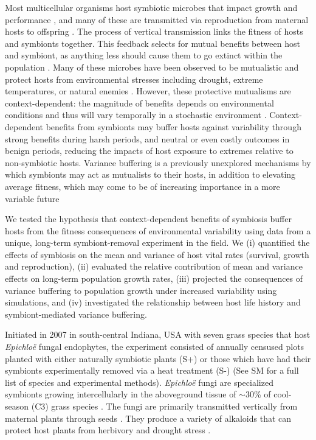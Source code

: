 \documentclass[12pt]{article}
\begin{document}
Most multicellular organisms host symbiotic microbes that impact growth and performance \cite{rodriguez2009fungal,mcfall2013animals}, and many of these are transmitted via reproduction from maternal hosts to offspring \cite{funkhouser2013mom}.
The process of vertical transmission links the fitness of hosts and symbionts together.
This feedback selects for mutual benefits between host and symbiont, as anything less should cause them to go extinct within the population \cite{ewald1987transmission,fine1975vectors}.
Many of these microbes have been observed to be mutualistic and protect hosts from environmental stresses including drought, extreme temperatures, or natural enemies \cite{russell2006costs,brownlie2009symbiont,kivlin2013fungal,corbin2017heritable,hoadley2019host}. 
However, these protective mutualisms are context-dependent: the magnitude of benefits depends on environmental conditions \cite{chamberlain2014context} and thus will vary temporally in a stochastic environment \cite{jordano1994spatial,billick2003relative}.
Context-dependent benefits from symbionts may buffer hosts against variability through strong benefits during harsh periods, and neutral or even costly outcomes in benign periods, reducing the impacts of host exposure to extremes relative to non-symbiotic hosts.
Variance buffering is a previously unexplored mechanisms by which symbionts may act as mutualists to their hosts, in addition to elevating average fitness, which may come to be of increasing importance in a more variable future \cite{rudgers2020climate}

We tested the hypothesis that context-dependent benefits of symbiosis buffer hosts from the fitness consequences of environmental variability using data from a unique, long-term symbiont-removal experiment in the field. We  (i) quantified the effects of symbiosis on the mean and variance of host vital rates (survival, growth and reproduction), (ii) evaluated the relative contribution of mean and variance effects on long-term population growth rates, (iii) projected the consequences of variance buffering to population growth under increased variability using simulations, and (iv) investigated the relationship between host life history and symbiont-mediated variance buffering.

Initiated in 2007 in south-central Indiana, USA with seven grass species that host \emph{Epichlo\"{e}} fungal endophytes, the experiment consisted of annually censused plots planted with either naturally symbiotic plants (S+) or those which have had their symbionts experimentally removed  via a heat treatment (S-) (See SM for a full list of species and experimental methods).
\emph{Epichlo\"{e}} fungi are specialized symbionts growing intercellularly in the aboveground tissue of  $\sim30$\% of cool-season (C3) grass species \cite{leuchtmann1992systematics}.
The fungi are primarily transmitted vertically from maternal plants through seeds \cite{cheplick2009ecology,rudgers2009fungus}.
They produce a variety of alkaloids that can protect host plants from herbivory \cite{brem2001epichloe} and drought stress \cite{cheplick2004recovery,kannadan2008endophyte,decunta2021systematic}.
\end{document}
